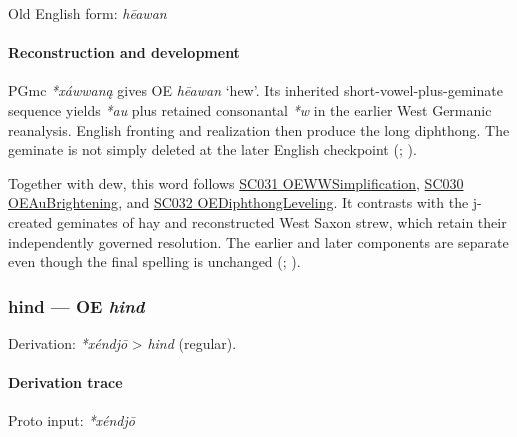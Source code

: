 \documentclass[
  british,
  a4paper,
]{article}
\begin{document}
Old English form: \emph{hēawan}

\paragraph{Reconstruction and
development}\label{reconstruction-and-development-2}

PGmc \emph{*xáwwaną} gives OE \emph{hēawan} `hew'. Its inherited
short-vowel-plus-geminate sequence yields \emph{*au} plus retained
consonantal \emph{*w} in the earlier West Germanic reanalysis. English
fronting and realization then produce the long diphthong. The geminate
is not simply deleted at the later English checkpoint
(;
).

Together with dew, this word follows
\hyperref[rule-OEWWSimplification]{SC031 OEWWSimplification},
\hyperref[rule-OEAuBrightening]{SC030 OEAuBrightening}, and
\hyperref[rule-OEDiphthongLeveling]{SC032 OEDiphthongLeveling}. It
contrasts with the j-created geminates of hay and reconstructed West
Saxon strew, which retain their independently governed resolution. The
earlier and later components are separate even though the final spelling
is unchanged (;
).

\subsubsection{\texorpdfstring{hind --- OE
\emph{hind}}{hind --- OE hind}}\label{hind-oe-hind}

Derivation: \emph{*xéndjō} \textgreater{} \emph{hind} (regular).

\paragraph{Derivation trace}\label{derivation-trace-37}

Proto input: \emph{*xéndjō}

\begingroup
\setlength{\fboxsep}{6pt}
\end{document}
